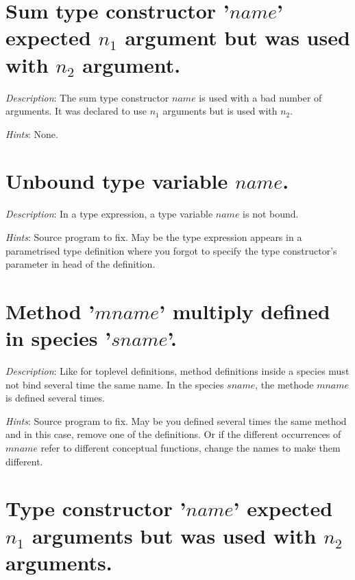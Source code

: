 \section*{Sum type constructor '$name$' expected $n_1$ argument but
  was used with $n_2$ argument.}

{\em Description}: The sum type constructor $name$ is used with a bad
number of arguments. It was declared to use $n_1$ arguments but is
used with $n_2$.

{\em Hints}: None.



\section*{Unbound type variable $name$.}

{\em Description}: In a type expression, a type variable $name$ is not
bound.

{\em Hints}: Source program to fix. May be the type expression appears
in a parametrised type definition where you forgot to specify the type
constructor's parameter in head of the definition.



\section*{Method '$mname$' multiply defined in species '$sname$'.}

{\em Description}: Like for toplevel definitions, method definitions
inside a species must not bind several time the same name. In the
species $sname$, the methode $mname$ is defined several times.

{\em Hints}: Source program to fix. May be you defined several times
the same method and in this case, remove one of the definitions. Or if
the different occurrences of $mname$ refer to different conceptual
functions, change the names to make them different.



\section*{Type constructor '$name$' expected $n_1$ arguments but was
  used with $n_2$ arguments.}

